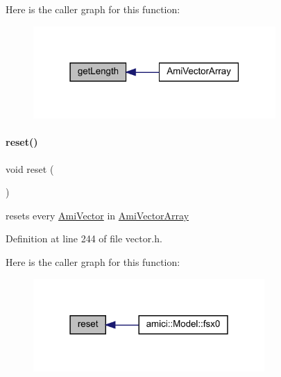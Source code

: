 Here is the caller graph for this function\+:
\nopagebreak
\begin{figure}[H]
\begin{center}
\leavevmode
\includegraphics[width=262pt]{classamici_1_1_ami_vector_array_a5f00d4dc3e7866d193ce926f35542801_icgraph}
\end{center}
\end{figure}
\mbox{\label{classamici_1_1_ami_vector_array_ad20897c5c8bd47f5d4005989bead0e55}} 
\paragraph{\texorpdfstring{reset()}{reset()}}
{\footnotesize\ttfamily void reset (\begin{DoxyParamCaption}{ }\end{DoxyParamCaption})}

resets every \mbox{\hyperlink{classamici_1_1_ami_vector}{Ami\+Vector}} in \mbox{\hyperlink{classamici_1_1_ami_vector_array}{Ami\+Vector\+Array}} 

Definition at line 244 of file vector.\+h.

Here is the caller graph for this function\+:
\nopagebreak
\begin{figure}[H]
\begin{center}
\leavevmode
\includegraphics[width=250pt]{classamici_1_1_ami_vector_array_ad20897c5c8bd47f5d4005989bead0e55_icgraph}
\end{center}
\end{figure}
